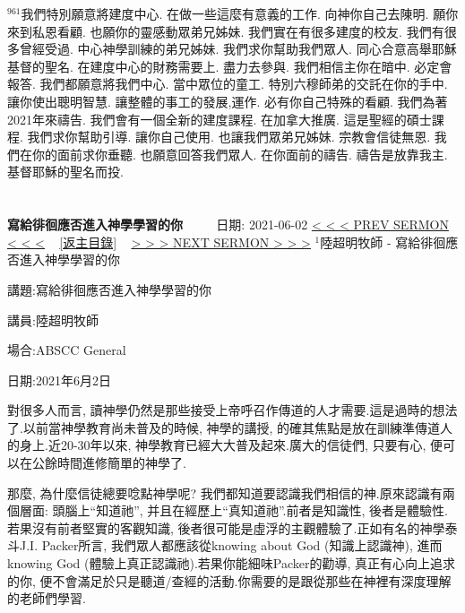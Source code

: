 \documentclass{book}
\begin{document}
$^{961}$我們特別願意將建度中心.
在做一些這麼有意義的工作.
向神你自己去陳明.
願你來到私恩看顧.
也願你的靈感動眾弟兄姊妹.
我們實在有很多建度的校友.
我們有很多曾經受過.
中心神學訓練的弟兄姊妹.
我們求你幫助我們眾人.
同心合意高舉耶穌基督的聖名.
在建度中心的財務需要上.
盡力去參與.
我們相信主你在暗中.
必定會報答.
我們都願意將我們中心.
當中眾位的童工.
特別六穆師弟的交託在你的手中.
讓你使出聰明智慧.
讓整體的事工的發展,運作.
必有你自己特殊的看顧.
我們為著2021年來禱告.
我們會有一個全新的建度課程.
在加拿大推廣.
這是聖經的碩士課程.
我們求你幫助引導.
讓你自己使用.
也讓我們眾弟兄姊妹.
宗教會信徒無恩.
我們在你的面前求你垂聽.
也願意回答我們眾人.
在你面前的禱告.
禱告是放靠我主.
基督耶穌的聖名而投.
\newpage



\section{}
\label{sec:0}
\textbf{寫給徘徊應否進入神學學習的你}
\newline
\newline
~~~~ 日期: 2021-06-02
\newline
\newline
\hyperref[sec:DOwKowWHLkM]{\small{< < < PREV SERMON < < <}}
~
\hyperref[sec:index]{\small{[返主目錄]}}
~
\hyperref[sec:1]{\small{> > > NEXT SERMON > > >}}
\newline
\newline
$^{1}$陸超明牧師 - 寫給徘徊應否進入神學學習的你

講題:寫給徘徊應否進入神學學習的你

講員:陸超明牧師

場合:ABSCC General

日期:2021年6月2日

對很多人而言, 讀神學仍然是那些接受上帝呼召作傳道的人才需要.這是過時的想法了.以前當神學教育尚未普及的時候, 神學的講授, 的確其焦點是放在訓練準傳道人的身上.近20-30年以來, 神學教育已經大大普及起來.廣大的信徒們, 只要有心, 便可以在公餘時間進修簡單的神學了.

 那麼, 為什麼信徒總要唸點神學呢? 我們都知道要認識我們相信的神.原來認識有兩個層面: 頭腦上“知道祂”, 并且在經歷上“真知道祂”.前者是知識性, 後者是體驗性.若果沒有前者堅實的客觀知識, 後者很可能是虛浮的主觀體驗了.正如有名的神學泰斗J.I. Packer所言, 我們眾人都應該從knowing about God (知識上認識神), 進而knowing God (體驗上真正認識祂).若果你能細味Packer的勸導, 真正有心向上追求的你, 便不會滿足於只是聽道/查經的活動.你需要的是跟從那些在神裡有深度理解的老師們學習.
\end{document}
